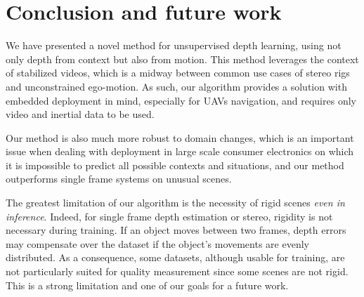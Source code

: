\documentclass[runningheads]{llncs}
\begin{document}
\section{Conclusion and future work}

We 
have
presented a novel method for unsupervised depth learning, using not only depth from context but also from motion. This method leverages the context of stabilized videos, which is a midway between 
common
use cases of stereo rigs and unconstrained ego-motion. As such, our algorithm provides a solution with embedded deployment in mind, especially for UAVs navigation, and requires only video and inertial data to be used.

Our method is also much more robust to domain changes, which is an important issue when dealing with deployment in large scale consumer electronics on which it is impossible to predict all possible contexts and situations, and our method outperforms single frame systems on unusual scenes.

The greatest limitation of our algorithm is the necessity of rigid scenes \emph{even in inference}. Indeed, for single frame depth estimation or stereo, rigidity is not necessary during training. If an object moves between two frames, depth errors may compensate over the dataset if the object’s movements are evenly distributed. As a consequence, some datasets, although usable for training, are not particularly suited for quality measurement since some scenes are not rigid. This is a strong limitation and one of our goals for a future work.




\end{document}
